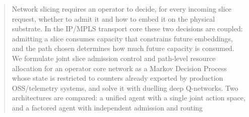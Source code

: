 \documentclass[10pt,journal,comsoc]{IEEEtran}
\begin{document}
\begin{abstract}
Network slicing requires an operator to decide, for every incoming slice
request, whether to admit it and how to embed it on the physical
substrate. In the IP/MPLS transport core these two decisions are coupled:
admitting a slice consumes capacity that constrains future embeddings,
and the path chosen determines how much future capacity is consumed. We
formulate joint slice admission control and path-level resource
allocation for an operator core network as a Markov Decision Process
whose state is restricted to counters already exported by production
OSS/telemetry systems, and solve it with duelling deep Q-networks. Two
architectures are compared: a unified agent with a single joint action
space, and a factored agent with independent admission and routing

\end{abstract}
\end{document}

